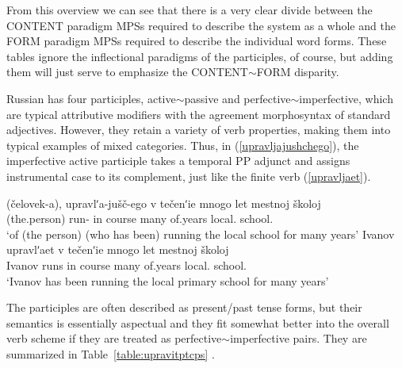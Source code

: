 \documentclass[output=paper,
modfonts
]{LSP/langsci}
\begin{document}
From this overview we can see that there is a very clear divide between the CONTENT paradigm MPSs required to describe the system as a whole and the FORM paradigm MPSs required to describe the individual word forms. These tables ignore the inflectional paradigms of the participles, of course, but adding them will just serve to emphasize the CONTENT$\sim$FORM disparity.

\begin{sloppypar}Russian has four participles, active$\sim$passive and perfective$\sim$imperfective, which are typical attributive modifiers with the agreement morphosyntax of standard adjectives. %
However, they retain a variety of verb properties, making them into typical examples of mixed categories. Thus, in  (\ref{upravljajushchego}),  the imperfective active participle   takes a temporal PP adjunct and assigns instrumental case to its complement, just like the finite verb (\ref{upravljaet}).\end{sloppypar}

\begin{exe}	\ex	\label{upravljajushchij}
	\begin{xlist}
\ex	\label{upravljajushchego}\gll	(čelovek-a), upravlʹa-jušč-ego v tečenʹie mnogo let mestnoj školoj\\
		(the.person) run-	in course many of.years local.  school.\\
\glt		‘of (the person) (who has been) running the local  school for many years’
\ex	\label{upravljaet}\gll	Ivanov upravlʹaet v tečenʹie mnogo let mestnoj  školoj\\
		Ivanov runs	in course many of.years local.  school.\\
\glt		‘Ivanov has been running the local primary school for many years’
	\end{xlist}
\end{exe}

The participles are often described as present/past tense forms, but their semantics is essentially aspectual and they fit somewhat better into the overall verb scheme if they are treated as perfective$\sim$imperfective pairs. They are summarized in Table~\ref{table:upravitptcps} \parencite[cf][361]{Wade92:book}.
\end{document}
